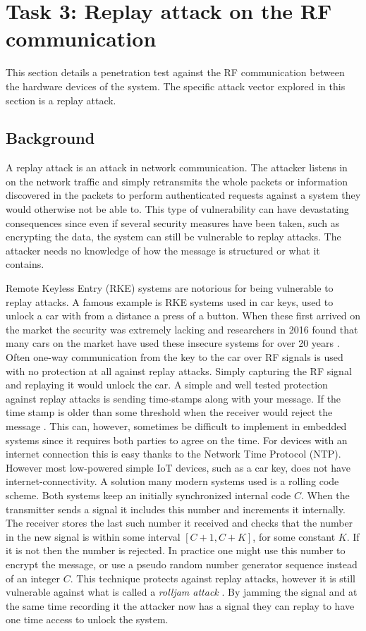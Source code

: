 \section{Task 3: Replay attack on the RF communication} \label{ch:pentesting:replay}
This section details a penetration test against the RF communication between the hardware devices of the system. The specific attack vector explored in this section is a replay attack.

\subsection{Background}
A replay attack is an attack in network communication. The attacker listens in on the network traffic and simply retransmits the whole packets or information discovered in the packets to perform authenticated requests against a system they would otherwise not be able to. This type of vulnerability can have devastating consequences since even if several security measures have been taken, such as encrypting the data, the system can still be vulnerable to replay attacks. The attacker needs no knowledge of how the message is structured or what it contains.

Remote Keyless Entry (RKE) systems are notorious for being vulnerable to replay attacks. A famous example is RKE systems used in car keys, used to unlock a car with from a distance a press of a button. When these first arrived on the market the security was extremely lacking and researchers in 2016 found that many cars on the market have used these insecure systems for over 20 years \cite{car-rke-systems}. Often one-way communication from the key to the car over RF signals is used with no protection at all against replay attacks. Simply capturing the RF signal and replaying it would unlock the car. A simple and well tested protection against replay attacks is sending time-stamps along with your message. If the time stamp is older than some threshold when the receiver would reject the message \cite{rke-replay}. This can, however, sometimes be difficult to implement in embedded systems since it requires both parties to agree on the time. For devices with an internet connection this is easy thanks to the Network Time Protocol (NTP). However most low-powered simple IoT devices, such as a car key, does not have internet-connectivity. A solution many modern systems used is a rolling code scheme. Both systems keep an initially synchronized internal code $C$. When the transmitter sends a signal it includes this number and increments it internally. The receiver stores the last such number it received and checks that the number in the new signal is within some interval $[C+1, C+K]$, for some constant $K$. If it is not then the number is rejected. In practice one might use this number to encrypt the message, or use a pseudo random number generator sequence instead of an integer $C$. This technique protects against replay attacks, however it is still vulnerable against what is called a \textit{rolljam attack} \cite{kamkar2015drive}. By jamming the signal and at the same time recording it the attacker now has a signal they can replay to have one time access to unlock the system.

